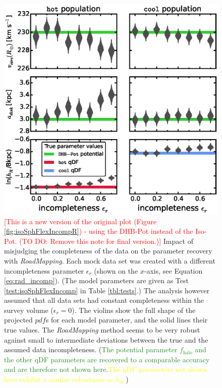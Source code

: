 \documentclass[iop,revtex4,numberedappendix,appendixfloats]{emulateapj}
\newcommand{\pdf}{\ensuremath{pdf}}
\newcommand{\RM}{{\sl RoadMapping}}
\newcommand{\NEW}[1]{\textcolor{ForestGreen}{#1}}
\newcommand{\OLD}[1]{\textcolor{Yellow}{#1}}%
\newcommand{\NOTE}[1]{\textcolor{Red}{#1}}
\begin{document}
\begin{figure}[!htbp]
\centering
\includegraphics[width=\columnwidth]{figs/MWbdhIncompR_violins.eps}
\caption{\NOTE{[This is a new version of the original plot (Figure \ref{fig:isoSphFlexIncompR}) - using the DHB-Pot instead of the Iso-Pot. (TO DO: Remove this note for final version.)]}  Impact of misjudging the completeness of the data on the parameter recovery with \RM{}. Each mock data set was created with a different incompleteness parameter $\epsilon_r$ (shown on the $x$-axis, see Equation \eqref{eq:rad_incomp}). (The model parameters are given as Test \ref{test:isoSphFlexIncomp} in Table \ref{tbl:tests}.) The analysis however assumed that all data sets had constant completeness within the survey volume ($\epsilon_r = 0$). The violins show the full shape of the projected \pdf{}s for each model parameter, and the solid lines their true values. The \RM{} method seems to be very robust against small to intermediate deviations between the true and the assumed data incompleteness. (\NEW{The potential parameter $f_\text{halo}$ and the other qDF parameters are recovered to a comparable accuracy and are therefore not shown here.}\OLD{The qDF parameters not shown here exhibit a similar robustness as $h_R$.})} 
\label{fig:MWdhbIncompR_violins}
\end{figure}
\end{document}
